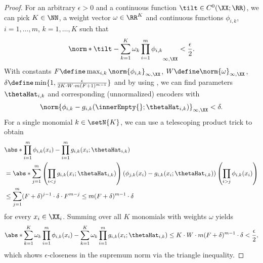\documentclass{article}
\begin{document}
\begin{proof}
  For an arbitrary $\epsilon > 0$ and a continuous
 function $\tilt \in C^0(\XX;\RR)$, we can pick $K\in \NN$, a weight vector $\omega \in \RR^K$
 and continuous functions $\phi_{i,k}$, $i=1,\ldots, m$, $k=1,\ldots, K$ such that
 \begin{align*}
  \norm*{\tilt - \sum_{k=1}^{K} \omega_k \prod_{i=1}^{m} \phi_{i,k}}_{\infty, \XX} < \frac{\epsilon}{2}.
 \end{align*}
 With constants $F \define \max_{i,k} \norm{\phi_{i,k}}_{\infty, \XX}$,
 $W \define \norm{\omega}_{\infty, \XX}$,
 $\delta \define \min \{1, \frac{\epsilon}{2 K \cdot W \cdot m (F+1)^{m-1}}\}$
 and by using
 , we can find parameters
 $\thetaHat_{i,k}$ and corresponding (unnormalized) encoders with
 \begin{align*}
  \norm{\phi_{i,k} - g_{i,k}(\innerEmpty{};\thetaHat_{i,k})}_{\infty, \XX} < \delta.
 \end{align*}
 For a single monomial $k \in \setN{K}$, we can use a telescoping product trick to obtain
 \begin{align*}
   & \abs*{\prod_{i=1}^m \phi_{i,k}(x_i) - \prod_{i=1}^{m} g_{i,k}(x_i; \thetaHat_{i,k})} \\
   & =
  \abs*{\sum_{j=1}^m \left(\prod_{i < j} g_{i,k}(x_i;\thetaHat_{i,k})\right)
   \left(\phi_{j,k}(x_i) - g_{i,k}(x_i;\thetaHat_{i,k})\right)
   \left(\prod_{i > j} \phi_{i,k}(x_i)\right)
  }                                                                                       \\
   & \leq \sum_{j=1}^{m} (F+\delta)^{j-1} \cdot \delta \cdot F^{m-j}
  \leq m (F+\delta)^{m-1}\cdot \delta
 \end{align*}
 for every $x_i \in \XX_i$. Summing over all $K$ monomials with weights $\omega$ yields
 \begin{align*}
  \abs*{\sum_{k=1}^{K}\omega_k\prod_{i=1}^m \phi_{i,k}(x_i) -
   \sum_{k=1}^{K} \omega_k \prod_{i=1}^{m} g_{i,k}(x_i; \thetaHat_{i,k})}
  \leq K \cdot W \cdot m (F+\delta)^{m-1} \cdot \delta < \frac{\epsilon}{2},
 \end{align*}
 which shows $\epsilon$-closeness in the supremum norm via the triangle inequality.


\end{proof}
\end{document}
